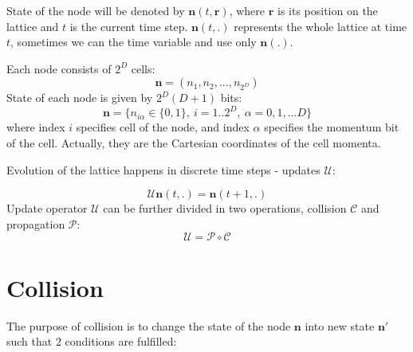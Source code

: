State of the node will be denoted by $\bm{n}(t,\bm{r})$, where $\bm{r}$ is its position on the lattice and $t$ is the current time step. $\bm{n}(t,.)$ represents the whole lattice at time $t$, sometimes we can the time variable and use only $\bm{n}(.)$.

Each node consists of $2^D$ cells:
\begin{equation}
\bm{n} = (n_1, n_2, ... , n_{2^D})
\end{equation}
State of each node is given by $2^D(D+1)$ bits: 
\begin{equation}
\bm{n} = \big\{ n_{i\alpha} \in \big\{0,1\big\},~i = 1..2^D, ~\alpha = 0,1,...D\big\}
\end{equation}
where index $i$ specifies cell of the node, and index $\alpha$ specifies the momentum bit of the cell. Actually, they are the Cartesian coordinates of the cell momenta.



Evolution of the lattice happens in discrete time steps - updates $\mathcal{U}$:

\begin{equation}
\mathcal{U} \bm{n}(t,.) = \bm{n}(t+1,.)
\end{equation} 
Update operator $\mathcal{U}$ can be further divided in two operations, collision $\mathcal{C}$ and propagation $\mathcal{P}$:
\begin{equation}
\mathcal{U} = \mathcal{P} \circ \mathcal{C}
\end{equation} 

\section{Collision}

The purpose of collision is to change the state of the node $\bm{n}$ into new state $\bm{n'}$ such that 2 conditions are fulfilled:

